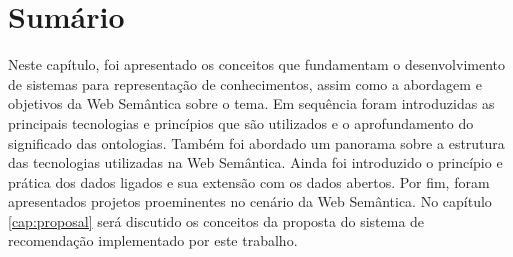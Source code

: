 \section{Sumário}

Neste capítulo, foi apresentado os conceitos que fundamentam o desenvolvimento de sistemas para representação de conhecimentos, assim como a abordagem e objetivos da Web Semântica sobre o tema. Em sequência foram introduzidas as principais tecnologias e princípios que são utilizados e o aprofundamento do significado das ontologias. Também foi abordado um panorama sobre a estrutura das tecnologias utilizadas na Web Semântica. Ainda foi introduzido o princípio e prática dos dados ligados e sua extensão com os dados abertos. Por fim, foram apresentados projetos proeminentes no cenário da Web Semântica. No capítulo \ref{cap:proposal} será discutido os conceitos da proposta do sistema de recomendação implementado por este trabalho.

\label{cap:semantic_web}
